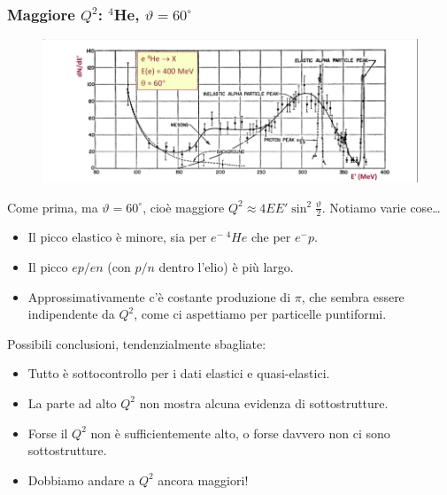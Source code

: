 \subsubsection{Maggiore $Q^2$: $^4$He, $\vartheta=60^\circ$}
\begin{figure}[H]
    \centering
    \includegraphics[width=.9\textwidth]{immagini/fig_higher_q2_60.png}
\end{figure}
Come prima, ma $\vartheta=60^\circ$, cioè maggiore $Q^2\approx4EE'\sin^2\frac\vartheta2$. Notiamo varie cose\dots
\begin{itemize}
    \item Il picco elastico è minore, sia per $e^-\,^4He$ che per $e^-p$.
    \item Il picco $ep/en$ (con $p/n$ dentro l'elio) è più largo.
    \item Approssimativamente c'è costante produzione di $\pi$, che sembra essere indipendente da $Q^2$, come ci aspettiamo per particelle puntiformi. 
\end{itemize}
Possibili conclusioni, tendenzialmente sbagliate:
\begin{itemize}
    \item Tutto è sottocontrollo per i dati elastici e quasi-elastici.
    \item La parte ad alto $Q^2$ non mostra alcuna evidenza di sottostrutture.
    \item Forse il $Q^2$ non è sufficientemente alto, o forse davvero non ci sono sottostrutture.
    \item Dobbiamo andare a $Q^2$ ancora maggiori!
\end{itemize}
